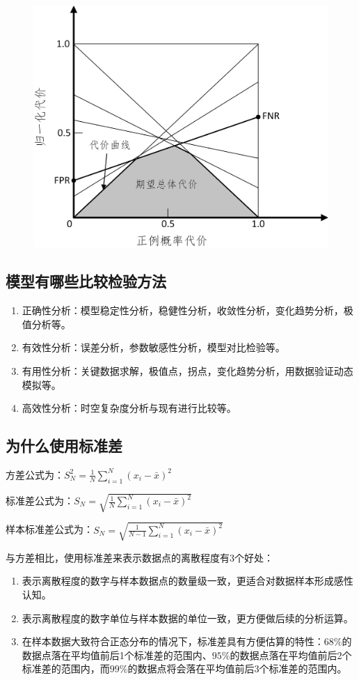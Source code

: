  \begin{figure}[h]
   \centering
   \includegraphics[width=.7\textwidth]{imgs/2.16.18.1.eps}
 \end{figure}

\subsection{模型有哪些比较检验方法}

\begin{enumerate}\itemsep0em
		\item 正确性分析：模型稳定性分析，稳健性分析，收敛性分析，变化趋势分析，极值分析等。
		\item 有效性分析：误差分析，参数敏感性分析，模型对比检验等。
		\item 有用性分析：关键数据求解，极值点，拐点，变化趋势分析，用数据验证动态模拟等。
		\item 高效性分析：时空复杂度分析与现有进行比较等。
\end{enumerate}


\subsection{为什么使用标准差}


方差公式为：$S^2_{N}=\frac{1}{N}\sum_{i=1}^{N}(x_{i}-\bar{x})^{2}$

标准差公式为：$S_{N}=\sqrt{\frac{1}{N}\sum_{i=1}^{N}(x_{i}-\bar{x})^{2}}$

样本标准差公式为：$S_{N}=\sqrt{\frac{1}{N-1}\sum_{i=1}^{N}(x_{i}-\bar{x})^{2}}$

与方差相比，使用标准差来表示数据点的离散程度有3个好处：

\begin{enumerate}\itemsep0em
\item 表示离散程度的数字与样本数据点的数量级一致，更适合对数据样本形成感性认知。
\item 表示离散程度的数字单位与样本数据的单位一致，更方便做后续的分析运算。
\item 在样本数据大致符合正态分布的情况下，标准差具有方便估算的特性：$68\%$的数据点落在平均值前后1个标准差的范围内、$95\%$的数据点落在平均值前后2个标准差的范围内，而$99\%$的数据点将会落在平均值前后3个标准差的范围内。
\end{enumerate}


